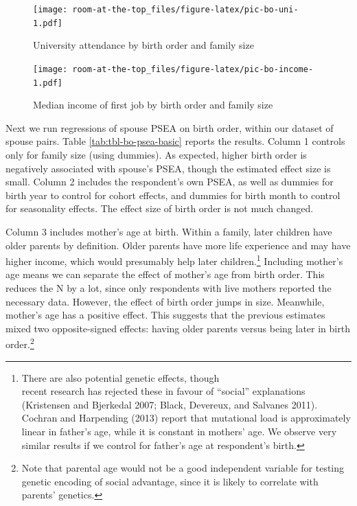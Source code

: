 \documentclass[
]{article}
\begin{document}
\begin{figure}
\centering
\texttt{[image: room-at-the-top\_files/figure-latex/pic-bo-uni-1.pdf]}
\caption{\label{fig:pic-bo-uni}University attendance by birth order and family size}
\end{figure}

\begin{figure}
\centering
\texttt{[image: room-at-the-top\_files/figure-latex/pic-bo-income-1.pdf]}
\caption{\label{fig:pic-bo-income}Median income of first job by birth order and family size}
\end{figure}

Next we run regressions of spouse PSEA on birth order, within our
dataset of spouse pairs. Table \ref{tab:tbl-bo-psea-basic} reports the
results. Column 1 controls only for family size (using dummies). As
expected, higher birth order is negatively associated with spouse's
PSEA, though the estimated effect size is small. Column 2 includes the
respondent's own PSEA, as well as dummies for birth year to control for
cohort effects, and dummies for birth month to control for seasonality
effects. The effect size of birth order is not much changed.

Column 3 includes mother's age at birth. Within a family, later children
have older parents by definition. Older parents have more life
experience and may have higher income, which would presumably help later
children.\footnote{There are also potential genetic effects, though\\
  recent research has rejected these in favour of ``social''
  explanations (Kristensen and Bjerkedal 2007; Black, Devereux, and Salvanes 2011).\\
  Cochran and Harpending (2013) report that mutational load is approximately
  linear in father's age, while it is constant in mothers' age. We
  observe very similar results if we control for father's age at
  respondent's birth.} Including mother's age means we can separate the effect
of mother's age from birth order. This reduces the N by a lot, since
only respondents with live mothers reported the necessary data. However,
the effect of birth order jumps in size. Meanwhile, mother's age has a
positive effect. This suggests that the previous estimates mixed two
opposite-signed effects: having older parents versus being later in
birth order.\footnote{Note that parental age would not be a good independent variable
  for testing genetic encoding of social advantage, since it is likely
  to correlate with parents' genetics.}
\end{document}

